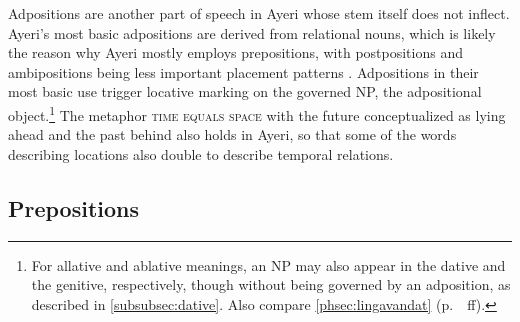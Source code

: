 Adpositions are another part of speech in Ayeri whose stem itself does not 
inflect. Ayeri's most basic adpositions are derived from relational nouns, 
which is likely the reason why Ayeri mostly employs prepositions, with 
postpositions and ambipositions being less important placement patterns 
\parencites[110--111]{hagege2010}[81\psqq]{lehmann2015}. Adpositions in their 
most basic use trigger locative marking on the governed NP, the adpositional
object.\footnote{For allative and ablative meanings, an NP may also
appear in the dative and the genitive, respectively, though without being governed by an adposition, as described in
\autoref{subsubsec:dative}. Also compare \autoref{phsec:lingavandat} (p.~\pageref{phsec:lingavandat}~ff).}
The metaphor \textsc{time equals space} with the future conceptualized 
as lying ahead and the past behind also holds in Ayeri,
so that some of the words describing locations also double to describe temporal
relations.

\subsection{Prepositions}
\label{subsec:prepositions}

